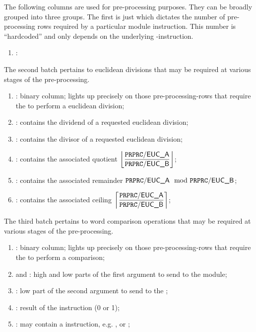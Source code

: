 The following columns are used for pre-processing purposes.
They can be broadly grouped into three groups.
The first is just \ppCt{} which dictates the number of pre-processing rows required by a particular \mmuMod{} module instruction.
This number is ``hardcoded'' and only depends on the underlying \mmuMod{}-instruction.
\begin{enumerate}
	\item \ppCt:
\end{enumerate}
The second batch pertains to euclidean divisions that may be required at various stages of the pre-processing.
\begin{enumerate}[resume]
	\item \ppEucFlag:
		binary column;
		lights up precisely on those pre-processing-rows that require the \eucMod{} to perform a euclidean division;
	\item \ppEucA:
		contains the dividend of a requested euclidean division;
	\item \ppEucB:
		contains the divisor of a requested euclidean division;
	\item \ppEucQuot:
		contains the associated quotient $\displaystyle \left\lfloor \frac{\texttt{PRPRC}\textsf{/}{\textsf{\textsf{EUC}\_A}}}{\texttt{PRPRC}\textsf{/}{\textsf{\textsf{EUC}\_B}}} \right\rfloor$;
	\item \ppEucRem:
		contains the associated remainder $\texttt{PRPRC}\textsf{/}{\textsf{\textsf{EUC}\_A}} \mod {\texttt{PRPRC}\textsf{/}{\textsf{\textsf{EUC}\_B}}}$;
	\item \ppEucCeil:
		contains the associated ceiling $\displaystyle \left\lceil \frac{\texttt{PRPRC}\textsf{/}{\textsf{\textsf{EUC}\_A}}}{\texttt{PRPRC}\textsf{/}{\textsf{\textsf{EUC}\_B}}} \right\rceil$;
\end{enumerate}
The third batch pertains to word comparison operations that may be required at various stages of the pre-processing.
\begin{enumerate}[resume]
	\item \ppWcpFlag:
		binary column;
		lights up precisely on those pre-processing-rows that require the \wcpMod{} to perform a comparison;
	\item \ppWcpArgOneHi{} and \ppWcpArgOneLo{}:
		high and low parts of the first argument to send to the \wcpMod{} module;
	\item \ppWcpArgTwoLo{}:
		low part of the second argument to send to the \wcpMod;
	\item \ppWcpRes:
		result of the instruction (0 or 1);
	\item \ppWcpInst:
		may contain a \wcpMod{} instruction, e.g. ,  or ;
\end{enumerate}
